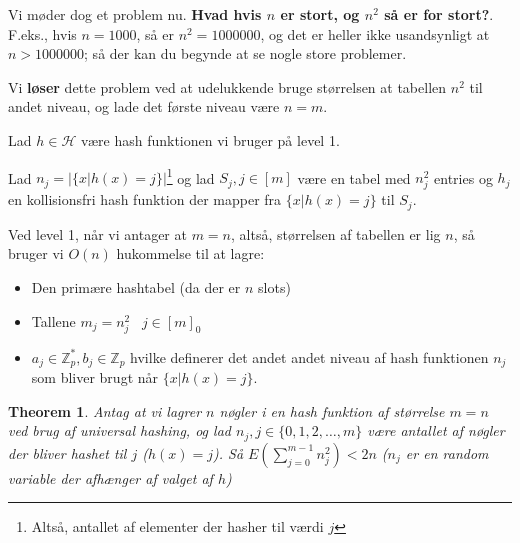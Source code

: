 \documentclass[11pt]{article}
\newtheorem{theorem}{Theorem}
\theoremstyle{definition}
\theoremstyle{remark}
\begin{document}
Vi møder dog et problem nu. \textbf{Hvad hvis $n$ er stort, og $n^{2}$ så er for stort?}. F.eks., hvis $n = 1000$, så er $n^{2} = 1 000 000$, og det er heller ikke usandsynligt at $n > 1 000 000$; så der kan du begynde at se nogle store problemer.

Vi \textbf{løser} dette problem ved at udelukkende bruge størrelsen at tabellen $n^2$ til andet niveau, og lade det første niveau være $n = m$.

Lad $h \in \mathcal{H}$ være hash funktionen vi bruger på level 1.

Lad $n_{j} = |\{x | h(x) = j\}|$\footnote{Altså, antallet af elementer der hasher til værdi $j$} og lad $S_{j}, j \in [m]$ være en tabel med $n_{j}^{2}$ entries og $h_{j}$ en kollisionsfri hash funktion der mapper fra $\{x | h(x) = j\}$ til $S_{j}$.

Ved level 1, når vi antager at $m = n$, altså, størrelsen af tabellen er lig $n$, så bruger vi $O(n)$ hukommelse til at lagre:
\begin{itemize}
\item Den primære hashtabel (da der er $n$ slots)
\item Tallene $m_{j} = n_{j}^{2}\;\;\;j \in [m]_{0}$
\item $a_{j} \in \mathbb{Z}_{p}^{*}, b_{j} \in \mathbb{Z}_{p}$ hvilke definerer det andet andet niveau af hash funktionen $n_{j}$ som bliver brugt når $\{x | h(x) = j\}$.
\end{itemize}

\begin{theorem}
Antag at vi lagrer $n$ nøgler i en hash funktion af størrelse $m = n$ ved brug af universal hashing, og lad $n_{j}, j \in \{0,1,2, \ldots, m\}$ være antallet af nøgler der bliver hashet til $j$ ($h(x) = j$). Så $E\left( \sum_{j=0}^{m-1}n_{j}^{2}  \right) < 2n$ ($n_{j}$ er en random variable der afhænger af valget af $h$)
\end{theorem}
\end{document}

